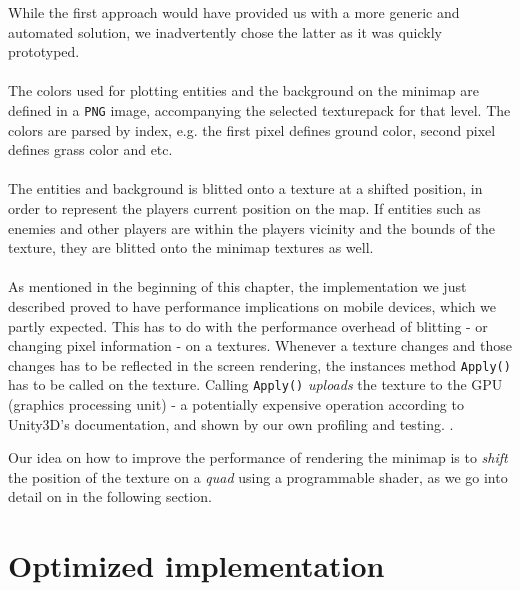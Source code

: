 While the first approach would have provided us with a more generic and
automated solution, we inadvertently chose the latter as it was quickly
prototyped.
\\
\\
The colors used for plotting entities and the background on the minimap are
defined in a \texttt{PNG} image, accompanying the selected texturepack for that
level. The colors are parsed by index, e.g. the first pixel defines ground
color, second pixel defines grass color and etc.
\\
\\
The entities and background is blitted onto a texture at a shifted position, in
order to represent the players current position on the map. If entities such as
enemies and other players are within the players vicinity and the bounds of the
texture, they are blitted onto the minimap textures as well.
\\
\\
As mentioned in the beginning of this chapter, the implementation we just
described proved to have performance implications on mobile devices, which we
partly expected. This has to do with the performance overhead of blitting - or
changing pixel information - on a textures. Whenever a texture changes and
those changes has to be reflected in the screen rendering, the instances method
\texttt{Apply()} has to be called on the texture. Calling \texttt{Apply()}
\textit{uploads} the texture to the GPU (graphics processing unit) - a
potentially expensive operation according to Unity3D's documentation, and shown
by our own profiling and testing.
.

Our idea on how to improve the performance of rendering the minimap is to
\textit{shift} the position of the texture on a \textit{quad} using a
programmable shader, as we go into detail on in the following section.
\section{Optimized implementation}

